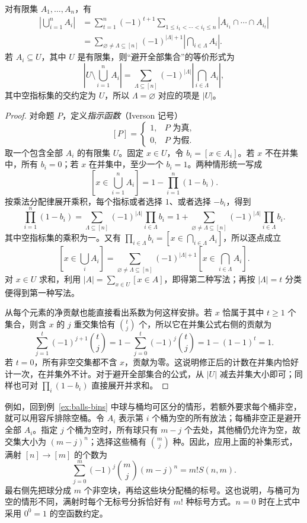 \documentclass[lang=cn,a4paper,fontset=none,zihao=false,10pt,openany,twoside]{beautybook}
\numberwithin{algorithm}{chapter}
\begin{document}
\begin{theorem}[容斥原理]\label{thm:inclusion-exclusion}
对有限集 $A_1,\ldots,A_n$，有
\[
 \begin{aligned}
 \left|\bigcup_{i=1}^n A_i\right|
 &=\sum_{t=1}^n(-1)^{t+1}
   \sum_{1\le i_1<\cdots<i_t\le n}
   |A_{i_1}\cap\cdots\cap A_{i_t}|\\
 &=\sum_{\varnothing\ne\Lambda\subseteq[n]}(-1)^{|\Lambda|+1}
   \left|\bigcap_{i\in\Lambda}A_i\right|.
 \end{aligned}
\]
若 $A_i\subseteq U$，其中 $U$ 是有限集，则“避开全部集合”的等价形式为
\[
 \left|U\setminus\bigcup_{i=1}^n A_i\right|
 =\sum_{\Lambda\subseteq[n]}(-1)^{|\Lambda|}
   \left|\bigcap_{i\in\Lambda}A_i\right|,
\]
其中空指标集的交约定为 $U$，所以 $\Lambda=\varnothing$ 对应的项是 $|U|$。
\end{theorem}
\begin{proof}
对命题 $P$，定义\emph{指示函数}（Iverson 记号）
\[
 [P]=\begin{cases}1,&P\text{ 为真},\\0,&P\text{ 为假}.\end{cases}
\]
取一个包含全部 $A_i$ 的有限集 $U$。固定 $x\in U$，令 $b_i=[x\in A_i]$。若 $x$ 不在并集中，所有 $b_i=0$；若 $x$ 在并集中，至少一个 $b_i=1$。两种情形统一写成
\[
 \left[x\in\bigcup_{i=1}^n A_i\right]=1-\prod_{i=1}^n(1-b_i).
\]
按乘法分配律展开乘积，每个指标或者选择 $1$、或者选择 $-b_i$，得到
\[
 \prod_{i=1}^n(1-b_i)
 =\sum_{\Lambda\subseteq[n]}(-1)^{|\Lambda|}\prod_{i\in\Lambda}b_i
 =1+\sum_{\varnothing\ne\Lambda\subseteq[n]}(-1)^{|\Lambda|}\prod_{i\in\Lambda}b_i.
\]
其中空指标集的乘积为一。又有 $\prod_{i\in\Lambda}b_i=[x\in\bigcap_{i\in\Lambda}A_i]$，所以逐点成立
\[
 \left[x\in\bigcup_i A_i\right]
 =\sum_{\varnothing\ne\Lambda\subseteq[n]}(-1)^{|\Lambda|+1}
   \left[x\in\bigcap_{i\in\Lambda}A_i\right].
\]
对 $x\in U$ 求和，利用 $|A|=\sum_{x\in U}[x\in A]$，即得第二种写法；再按 $|\Lambda|=t$ 分类便得到第一种写法。

从每个元素的净贡献也能直接看出系数为何这样安排。若 $x$ 恰属于其中 $t\ge1$ 个集合，则含 $x$ 的 $j$ 重交集恰有 $\binom tj$ 个，所以它在并集公式右侧的贡献为
\[
 \sum_{j=1}^{t}(-1)^{j+1}\binom tj
 =1-\sum_{j=0}^{t}(-1)^j\binom tj
 =1-(1-1)^t=1.
\]
若 $t=0$，所有非空交集都不含 $x$，贡献为零。这说明修正后的计数在并集内恰好计一次，在并集外不计。对于避开全部集合的公式，从 $|U|$ 减去并集大小即可；同样也可对 $\prod_i(1-b_i)$ 直接展开并求和。
\end{proof}
例如，回到例~\ref{ex:balls-bins} 中球与桶均可区分的情形，若额外要求每个桶非空，就可以用容斥排除空桶。令 $A_i$ 表示第 $i$ 个桶为空的所有放法；每桶非空正是避开全部 $A_i$。指定 $j$ 个桶为空时，所有球只有 $m-j$ 个去处，其他桶仍允许为空，故交集大小为 $(m-j)^n$；选择这些桶有 $\binom mj$ 种。因此，应用上面的补集形式，满射 $[n]\to[m]$ 的个数为
\[
 \sum_{j=0}^m(-1)^j\binom mj(m-j)^n=m!S(n,m).
\]
最右侧先把球分成 $m$ 个非空块，再给这些块分配桶的标号。这也说明，与桶可为空的情形不同，满射时每个无标号分拆恰好有 $m!$ 种标号方式。$n=0$ 时在上式中采用 $0^0=1$ 的空函数约定。
\end{document}
